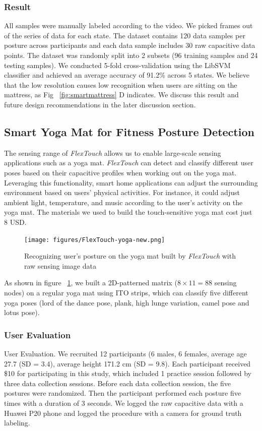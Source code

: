 \subsubsection{Result}
All samples were manually labeled according to the video. We picked frames out of the series of data for each state. The dataset contains 120 data samples per posture across participants and each data sample includes 30 raw capacitive data points. The dataset was randomly split into 2 subsets (96 training samples and 24 testing samples). We conducted 5-fold cross-validation using the LibSVM classifier and achieved an average accuracy of 91.2\% across 5 states. We believe that the low resolution causes low recognition when users are sitting on the mattress, as Fig ~\ref{fig:smartmattress} D indicates. We discuss this result and future design recommendations in the later discussion section.   

\subsection{Smart Yoga Mat for Fitness Posture Detection}
The sensing range of \textit{FlexTouch} allows us to enable large-scale sensing applications such as a yoga mat.  \textit{FlexTouch} can detect and classify different user poses based on their capacitive profiles when working out on the yoga mat. Leveraging this functionality, smart home applications can adjust the surrounding environment based on users' physical activities. For instance, it could adjust ambient light, temperature, and music according to the user's activity on the yoga mat. The materials we used to build the touch-sensitive yoga mat cost just 8 USD. 

\begin{figure}[ht]
\centering
  \texttt{[image: figures/FlexTouch-yoga-new.png]}
  \caption{Recognizing user's posture on the yoga mat built by \textit{FlexTouch} with raw sensing image data}  \label{fig:yogamat}
\end{figure}

As shown in figure ~\ref{fig:yogamat}, we built a 2D-patterned matrix ($8\times11 = 88$ sensing nodes) on a regular yoga mat using ITO strips, which can classify five different yoga poses (lord of the dance pose, plank, high lunge variation, camel pose and lotus pose).

\subsubsection{User Evaluation}
User Evaluation. We recruited 12 participants (6 males, 6 females, average age 27.7 (SD = 3.4), average height 171.2 cm (SD = 9.8). Each participant received \$10 for participating in this study, which included 1 practice session followed by three data collection sessions. Before each data collection session, the five postures were randomized. Then the participant performed each posture five times with a duration of 3 seconds. We logged the raw capacitive data with a Huawei P20 phone and logged the procedure with a camera for ground truth labeling.

